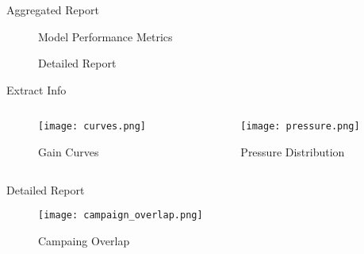 \documentclass[pdf]{beamer}
\begin{document}
\begin{frame}{Aggregated Report}
     \begin{figure}
\caption{Model Performance Metrics}
     \end{figure}
          \begin{figure}
\caption{Detailed Report}
    	\end{figure}
\end{frame}

\begin{frame}{Extract Info}
     \begin{columns}[T] %
     \begin{column}[T]{5cm} %
              \begin{figure}
     \texttt{[image: curves.png]}
     \caption{Gain Curves}
              \end{figure}
     \end{column}
          \begin{column}[T]{5cm} %
          \begin{figure}
     \texttt{[image: pressure.png]}
          \caption{Pressure Distribution}
              \end{figure}
    	\end{column}
     \end{columns}
\end{frame}

\begin{frame}{Detailed Report}
\begin{figure}
 \texttt{[image: campaign\_overlap.png]}
           \caption{Campaing Overlap}
\end{figure}
\end{frame}
\end{document}
